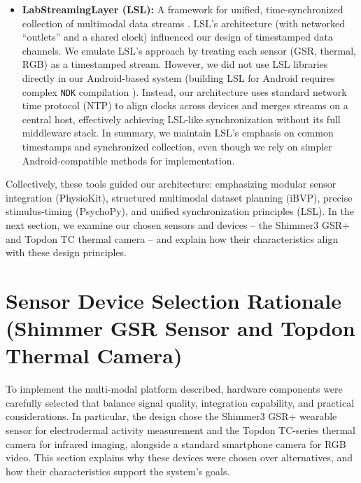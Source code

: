 \documentclass{report}
\begin{document}
\begin{itemize}
	\item \textbf{LabStreamingLayer (LSL):} A framework for unified, time-synchronized collection of multimodal data streams \cite{lsl}. LSL's architecture (with networked ``outlets'' and a shared clock) influenced our design of timestamped data channels. We emulate LSL's approach by treating each sensor (GSR, thermal, RGB) as a timestamped stream. However, we did not use LSL libraries directly in our Android-based system (building LSL for Android requires complex \texttt{NDK} compilation \cite{lsl}). Instead, our architecture uses standard network time protocol (NTP) to align clocks across devices and merges streams on a central host, effectively achieving LSL-like synchronization without its full middleware stack. In summary, we maintain LSL's emphasis on common timestamps and synchronized collection, even though we rely on simpler Android-compatible methods for implementation.
\end{itemize}

Collectively, these tools guided our architecture: emphasizing modular sensor integration (PhysioKit), structured multimodal dataset planning (iBVP), precise stimulus-timing (PsychoPy), and unified synchronization principles (LSL). In the next section, we examine our chosen sensors and devices -- the Shimmer3 GSR+ and Topdon TC thermal camera -- and explain how their characteristics align with these design principles.


\section{Sensor Device Selection Rationale (Shimmer GSR Sensor and Topdon Thermal Camera)}
\label{sec:sensor_selection}

To implement the multi-modal platform described, hardware components were carefully selected that balance signal quality, integration capability, and practical considerations. In particular, the design chose the Shimmer3 GSR+ wearable sensor for electrodermal activity measurement and the Topdon TC-series thermal camera for infrared imaging, alongside a standard smartphone camera for RGB video. This section explains why these devices were chosen over alternatives, and how their characteristics support the system's goals.
\end{document}
